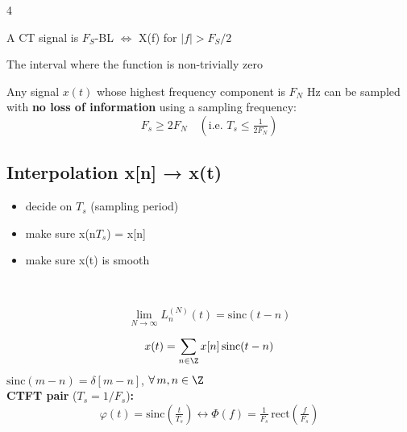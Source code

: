 \documentclass[8pt,a4paper,landscape]{extarticle}
\begin{document}
\begin{multicols*}{4}
\begin{defn}[title=BandLimited (BL) functions]
A CT signal is $F_S$-BL $\Leftrightarrow$ X(f) for $|f|>F_S/2$
\end{defn}

\begin{defn}[title=Support of a function]
The interval where the function is non-trivially zero
\end{defn}

\begin{thm}[title=Sampling theorem (Shannon--Nyquist)]
Any signal $x(t)$ whose highest frequency component is $F_N$ Hz can be sampled with \textbf{no loss of information} using a sampling frequency:
\[F_s \ge 2F_N \quad \left(\text{i.e.\ } T_s \le \tfrac{1}{2F_N}\right)\]
\end{thm}

\subsection{Interpolation x[n] → x(t)}
\begin{prop}[title=Interpolation requirement]
\begin{itemize}
  \item decide on $T_s$ (sampling period)
  \item make sure x(n$T_s$) = x[n]
  \item make sure x(t) is smooth
\end{itemize}
\end{prop}

\begin{prop}[title=Interpolations pros and cons]
\\
\end{prop}

\begin{thm}[title=Remarkable result]
\[\lim_{N\to\infty} L_n^{(N)}(t) = \mathrm{sinc}(t-n)\]
\end{thm}

\begin{defn}[title=Sinc interpolation]
\[x(t)=\sum_{n\in\Z} x[n]\,\mathrm{sinc}(t-n)\]
$\mathrm{sinc}(m-n)=\delta[m-n]$, $\forall\, m,n\in\Z$\\
\textbf{CTFT pair} ($T_s=1/F_s$)\textbf{:}
\[\varphi(t)=\mathrm{sinc}\!\left(\tfrac{t}{T_s}\right)\longleftrightarrow\Phi(f)=\tfrac{1}{F_s}\,\mathrm{rect}\!\left(\tfrac{f}{F_s}\right)\]
\end{defn}


\end{multicols*}
\end{document}
